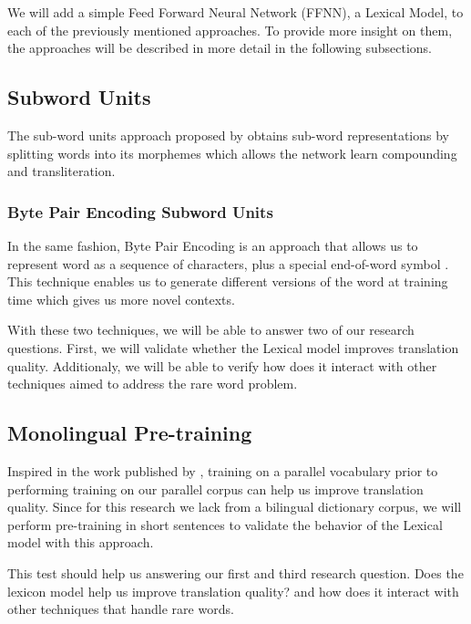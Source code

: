 We will add a simple Feed Forward Neural Network (FFNN), a Lexical Model, to each of the previously mentioned approaches. To provide more insight on them, the approaches will be described in more detail in the following subsections.

\subsection{Subword Units}

The sub-word units approach proposed by \citet{DBLP:journals/corr/SennrichHB15} obtains sub-word representations by splitting words into its morphemes which allows the network learn compounding and transliteration. 

\subsubsection{Byte Pair Encoding Subword Units}

In the same fashion, Byte Pair Encoding is an approach that allows us to represent word as a sequence of characters, plus a special end-of-word symbol \citep{DBLP:journals/corr/SennrichHB15}. This technique enables us to generate different versions of the word at training time which gives us more novel contexts.

With these two techniques, we will be able to answer two of our research questions. First, we will validate whether the Lexical model improves translation quality. Additionaly, we will be able to verify how does it interact with other techniques aimed to address the rare word problem.

\subsection{Monolingual Pre-training}

 Inspired in the work published by \citet*{DBLP:journals/corr/ZophYMK16}, training on a parallel vocabulary prior to performing training on our parallel corpus can help us improve translation quality. Since for this research we lack from a bilingual dictionary corpus, we will  perform pre-training in short sentences to validate the behavior of the Lexical model with this approach.
 
 This test should help us answering our first and third research question. Does the lexicon model help us improve translation quality? and how does it interact with other techniques that handle rare words.
 
